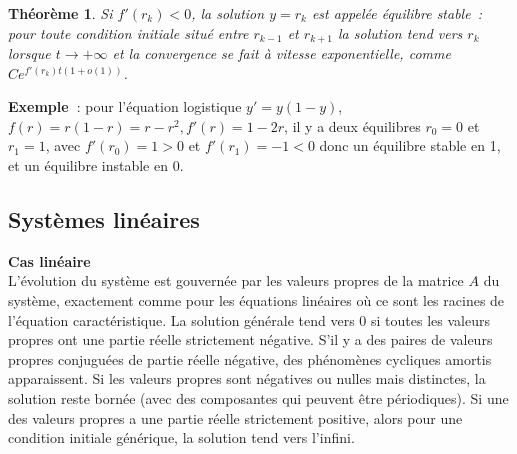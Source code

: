 \documentclass[a4paper,11pt]{book}
\newtheorem{thm}{Théorème}
\begin{document}
\begin{giacjshere}
\begin{thm}
Si $f'(r_k) < 0$, la solution $y=r_k$ est appel\'ee \'equilibre
stable~: pour toute condition initiale situ\'e entre $r_{k-1}$ et $r_{k+1}$
la solution tend vers $r_k$ lorsque $t \rightarrow +\infty$ 
et la convergence se fait \`a vitesse
exponentielle, comme $Ce^{f'(r_k)t(1+o(1))}$.
\end{thm}

{\bf Exemple~}: pour l'\'equation logistique $y'=y(1-y)$,
$f(r)=r(1-r)=r-r^2, f'(r)=1-2r$, 
il y a deux \'equilibres $r_0=0$ et $r_1=1$, avec $f'(r_0)=1>0$
et $f'(r_1)=-1<0$ donc un \'equilibre stable en 1, et un \'equilibre
instable en 0.

\subsection{Syst\`emes lin\'eaires}
{\bf Cas lin\'eaire}\\
L'\'evolution du syst\`eme est gouvern\'ee par les valeurs propres
de la matrice $A$ du syst\`eme, exactement comme pour les \'equations
lin\'eaires o\`u ce sont les racines de l'\'equation
caract\'eristique.
La solution g\'en\'erale tend vers 0 si toutes les valeurs propres
ont une partie r\'eelle strictement n\'egative. S'il y a des paires
de valeurs propres conjugu\'ees de partie r\'eelle n\'egative,
des ph\'enom\`enes cycliques amortis apparaissent.
Si les valeurs propres sont n\'egatives ou nulles mais distinctes, la solution
reste born\'ee (avec des composantes qui peuvent \^etre
p\'eriodiques).
Si une des valeurs propres a une partie r\'eelle strictement positive,
alors pour une condition initiale g\'en\'erique, la solution tend vers
l'infini.


\end{giacjshere}
\end{document}
